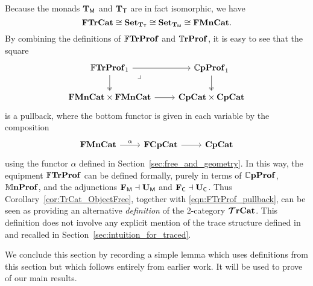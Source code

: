 \documentclass[11pt,oneside,article]{memoir}
\begin{document}
\begin{remark}
      \label{rem:characterization_of_traced}
   Because the monads $\mathbf{T}_{\mathsf{M}}$ and $\mathbf{T}_{\mathsf{T}}$ are in fact isomorphic, we have
   \[
      \mathbf{FTrCat} \cong \mathbf{Set}_{\mathbf{T}_{\mathsf{T}}} \cong \mathbf{Set}_{\mathbf{T}_{\mathsf{M}}} \cong \mathbf{FMnCat}.
   \]
   By combining the definitions of $\mathbb{F}\mathbf{TrProf}$ and $\mathbb{T}\mathbf{rProf}$, it is easy to see that the square
   \begin{equation} \begin{tikzcd}
         \label{eqn:FTrProf_pullback}
      \dFrTrProf_1 \ar[r] \ar[d,two heads] \ar[dr,phantom,"\lrcorner" very near start]
         & \dCompProf_1 \ar[d,two heads] \\
      \FrMonCat\times\FrMonCat \ar[r]
         & \CompCat\times\CompCat
   \end{tikzcd} \end{equation}
   is a pullback, where the bottom functor is given in each variable by the composition
   \[ \begin{tikzcd}
      \FrMonCat \ar[r,"\alpha"] & \FrCompCat \ar[r] & \CompCat
   \end{tikzcd} \]
   using the functor $\alpha$ defined in Section~\ref{sec:free_and_geometry}. In this way, the
   equipment $\mathbb{F}\mathbf{TrProf}$ can be defined formally, purely in terms of $\mathbb{C}\mathbf{pProf}$, $\mathbb{M}\mathbf{nProf}$, and
   the adjunctions $\mathbf{F}_{\mathsf{M}}\dashv\mathbf{U}_{\mathsf{M}}$ and $\mathbf{F}_{\mathsf{C}}\dashv\mathbf{U}_{\mathsf{C}}$. Thus Corollary~\ref{cor:TrCat_ObjectFree},
   together with \eqref{eqn:FTrProf_pullback}, can be seen as providing an alternative
   \emph{definition} of the 2-category $\bm{\mathcal{T}}\mathbf{rCat}$. This definition does not involve any explicit
   mention of the trace structure defined in \cite{JoyalStreetVerity} and recalled in
   Section~\ref{sec:intuition_for_traced}.
\end{remark}

We conclude this section by recording a simple lemma which uses definitions from this section but
which follows entirely from earlier work. It will be used to prove of our main results.
\end{document}
